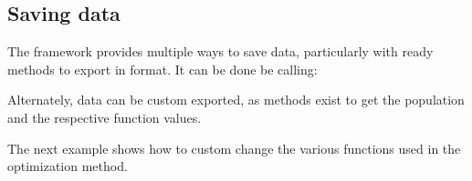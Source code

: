 \documentclass[letterpaper,12pt,english]{sphinxmanual}
\begin{document}
\subsection{Saving data}
\label{\detokenize{examples/getting_started_example:saving-data}}
\sphinxAtStartPar
The framework provides multiple ways to save data, particularly with ready methods to export in  format. It can be
done be calling:

\begin{sphinxVerbatim}[commandchars=\\\{\}]
\end{sphinxVerbatim}

\sphinxAtStartPar
Alternately, data can be custom exported, as  methods exist to get the population and the respective function values.

\begin{sphinxVerbatim}[commandchars=\\\{\}]
   
\end{sphinxVerbatim}

\sphinxAtStartPar
The next example shows how to custom change the various functions used in the optimization method.
\end{document}
